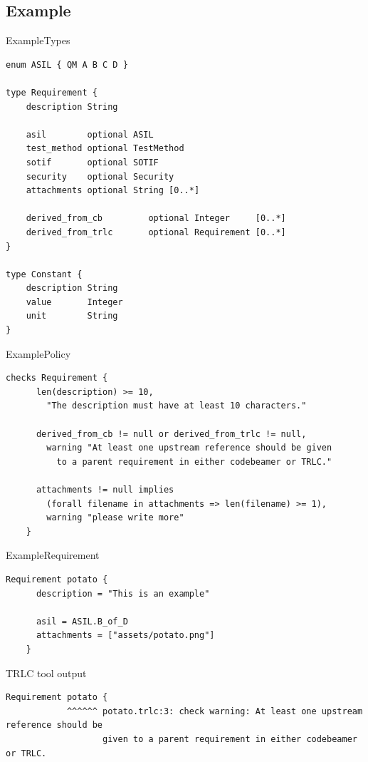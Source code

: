 \documentclass[aspectratio=169]{beamer}
\begin{document}
\subsection{Example}
\begin{frame}[fragile]{Example}{Types}
  \begin{lstlisting}
enum ASIL { QM A B C D }

type Requirement {
    description String

    asil        optional ASIL
    test_method optional TestMethod
    sotif       optional SOTIF
    security    optional Security
    attachments optional String [0..*]

    derived_from_cb         optional Integer     [0..*]
    derived_from_trlc       optional Requirement [0..*]
}

type Constant {
    description String
    value       Integer
    unit        String
}
  \end{lstlisting}
\end{frame}

\begin{frame}[fragile]{Example}{Policy}
  \begin{lstlisting}[gobble=4]
    checks Requirement {
      len(description) >= 10,
        "The description must have at least 10 characters."

      derived_from_cb != null or derived_from_trlc != null,
        warning "At least one upstream reference should be given
          to a parent requirement in either codebeamer or TRLC."

      attachments != null implies
        (forall filename in attachments => len(filename) >= 1),
        warning "please write more"
    }
  \end{lstlisting}
\end{frame}

\begin{frame}[fragile]{Example}{Requirement}
  \begin{lstlisting}[gobble=4]
    Requirement potato {
      description = "This is an example"

      asil = ASIL.B_of_D
      attachments = ["assets/potato.png"]
    }
  \end{lstlisting}
  \pause
  \begin{block}{TRLC tool output}
    \scriptsize
\begin{verbatim}
Requirement potato {
            ^^^^^^ potato.trlc:3: check warning: At least one upstream reference should be
                   given to a parent requirement in either codebeamer or TRLC.
\end{verbatim}
  \end{block}
\end{frame}
\end{document}
